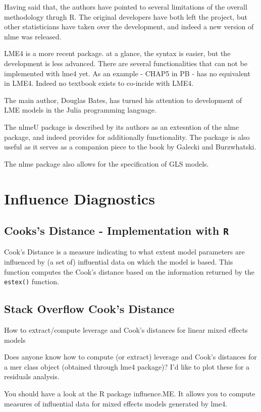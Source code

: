 	Having said that, the authors have pointed to several limitations of the overall methodology thrugh R.
	The original developers have both left the project, but other statisticians have taken over the development, and indeed a new version of nlme was released.
	
	LME4 is a more recent package. at a glance, the syntax is easier, but the development is less advanced. There are several functionalities that can not be implemented with lme4 yet. 
	As an example - CHAP5 in PB - has no equivalent in LME4. Indeed no textbook exists to co-incide with LME4.
	
	The main author, Douglas Bates, has turned his attention to development of LME models in the Julia programming language.
	
	The nlmeU package is described by its authors as an extesntion of the nlme package, and indeed provides for additionally functionality. The package is also useful as it serves as a companion piece to the 
	book by Galecki and Burzwhatski.
	
	The nlme package also allows for the specification of GLS models.
	
	
\chapter{Influence Diagnostics}	
\section{Cooks's Distance - Implementation with \texttt{R}}
Cook's Distance is a measure indicating to what extent model parameters are influenced by (a set of) influential data on which the model is based. This function computes the Cook's distance based on the information returned by the \texttt{estex()} function.


\section{Stack Overflow Cook's Distance}
How to extract/compute leverage and Cook's distances for linear mixed effects models

Does anyone know how to compute (or extract) leverage and Cook's distances for a mer class object (obtained through lme4 package)? I'd like to plot these for a residuals analysis.

You should have a look at the R package influence.ME. It allows you to compute measures of influential data for mixed effects models generated by lme4.

